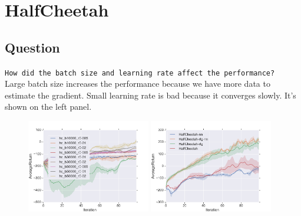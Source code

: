 \documentclass[12pt]{article}
\begin{document}
	\section{HalfCheetah}
	\subsection{Question}
	\texttt{How did the batch size and learning rate affect the performance?}\\
	Large batch size increases the performance because we have more data to estimate the gradient. Small learning rate is bad because it converges slowly. It's shown on the left panel.\\
	\begin{figure}[h!]
		\includegraphics[width=0.48\textwidth]{problem8a.png}
		\includegraphics[width=0.48\textwidth]{problem8b.png}
	\end{figure}
	\\
\end{document}
